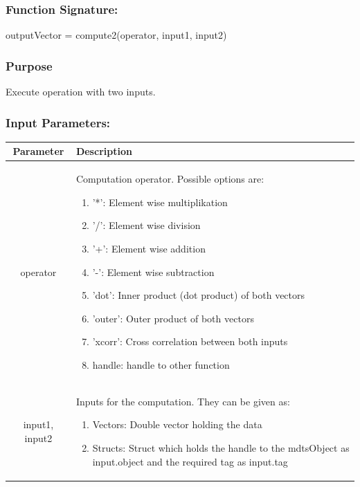 \documentclass[a4]{scrreprt}
\begin{document}
\subsubsection{Function Signature:}

\begin{center}
	outputVector = compute2(operator, input1, input2)
\end{center}

\subsubsection{Purpose}

Execute operation with two inputs.

\subsubsection{Input Parameters:}

\begin{longtabu} to \textwidth {|c|X|}
	\hline
	\textbf{Parameter} & \textbf{Description} \\ \hline
	\endhead
	operator & Computation operator. Possible options are:
	\begin{enumerate}
		\item '*': Element wise multiplikation
		\item '/': Element wise division
		\item '+': Element wise addition
		\item '-': Element wise subtraction
		\item 'dot': Inner product (dot product) of both vectors
		\item 'outer': Outer product of both vectors
		\item 'xcorr': Cross correlation between both inputs
		\item handle: handle to other function
	\end{enumerate} \\ \hline
	input1, input2 & Inputs for the computation. They can be given as:
	\begin{enumerate}
		\item Vectors: Double vector holding the data
		\item Structs: Struct which holds the handle to the mdtsObject as input.object and the required tag as input.tag 
	\end{enumerate} \\ \hline
\end{longtabu}
\end{document}
